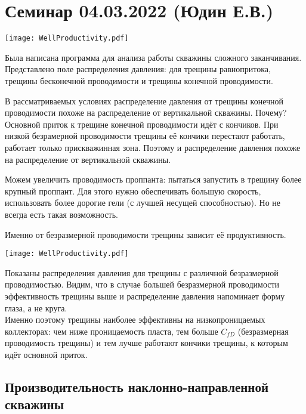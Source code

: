 \documentclass[main.tex]{subfiles}
\begin{document}
\section{Семинар 04.03.2022 (Юдин Е.В.)}

\texttt{[image: WellProductivity.pdf]}

Была написана программа для анализа работы скважины сложного заканчивания. Представлено поле распределения давления: для трещины равнопритока, трещины бесконечной проводимости и трещины конечной проводимости.

В рассматриваемых условиях распределение давления от трещины конечной проводимости похоже на распределение от вертикальной скважины. Почему?\\

Основной приток к трещине конечной проводимости идёт с кончиков. При низкой безрамерной проводимости трещины её кончики перестают работать, работает только прискважинная зона. Поэтому и распределение давления похоже на распределение от вертикальной скважины.

Можем увеличить проводимость проппанта: пытаться запустить в трещину более крупный проппант. Для этого нужно обеспечивать большую скорость, использовать более дорогие гели (с лучшей несущей способностью). Но не всегда есть такая возможность.

Именно от безразмерной проводимости трещины зависит её продуктивность.

\texttt{[image: WellProductivity.pdf]}

Показаны распределения давления для трещины с различной безразмерной проводимостью. Видим, что в случае большей безразмерной проводимости эффективность трещины выше и распределение давления напоминает форму глаза, а не круга.\\

Именно поэтому трещины наиболее эффективны на низкопроницаемых коллекторах: чем ниже проницаемость пласта, тем больше $C_{fD}$ (безразмерная проводимость трещины) и тем лучше работают кончики трещины, к которым идёт основной приток.

\subsection{Производительность наклонно-направленной скважины}
\end{document}
